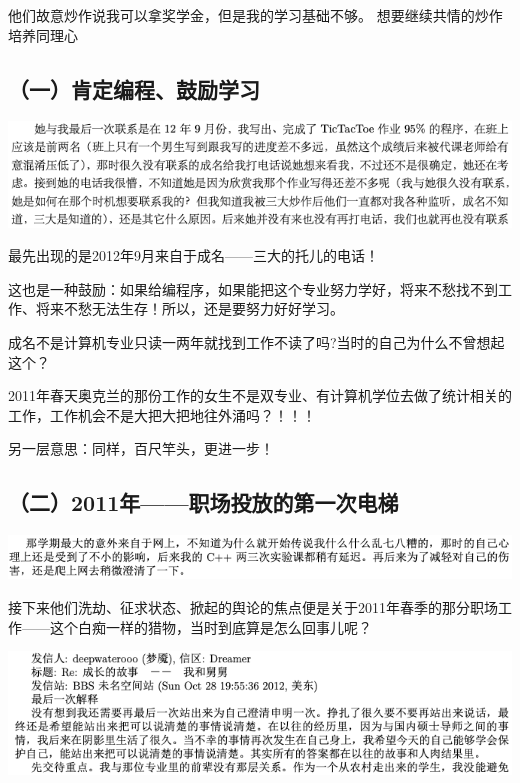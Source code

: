 \documentclass[9pt, b5paper]{article}
\begin{document}
他们故意炒作说我可以拿奖学金，但是我的学习基础不够。
想要继续共情的炒作培养同理心

\subsection{（一）肯定编程、鼓励学习}
\label{sec:org46f213f}

\begin{center}
\includegraphics[width=.9\linewidth]{./pic/backups_plans_20210424_100901.png}
\end{center}

最先出现的是2012年9月来自于成名——三大的托儿的电话！

这也是一种鼓励：如果给编程序，如果能把这个专业努力学好，将来不愁找不到工作、将来不愁无法生存！所以，还是要努力好好学习。

成名不是计算机专业只读一两年就找到工作不读了吗?当时的自己为什么不曾想起这个？

2011年春天奥克兰的那份工作的女生不是双专业、有计算机学位去做了统计相关的工作，工作机会不是大把大把地往外涌吗？！！！

另一层意思：同样，百尺竿头，更进一步！

\subsection{（二）2011年——职场投放的第一次电梯}
\label{sec:org9b29e46}

\begin{center}
\includegraphics[width=.9\linewidth]{./pic/backups_plans_20210424_205834.png}
\end{center}

接下来他们洗劫、征求状态、掀起的舆论的焦点便是关于2011年春季的那分职场工作——这个白痴一样的猎物，当时到底算是怎么回事儿呢？

\begin{center}
\includegraphics[width=.9\linewidth]{./pic/backups_plans_20210424_093531.png}
\end{center}
\end{document}
